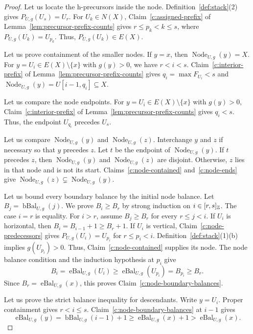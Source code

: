 \begin{proof}
 Let us locate the h-precursors inside the node.
Definition~\ref{def:stack}(2) gives $P_{U,g}(U_s)=U_r$.
For $U_k\in N(X)$, Claim~\ref{c:assigned-prefix} of
Lemma~\ref{lem:precursor-prefix-counts} gives $r\le p_k<k\le s$,
where $P_{U,g}(U_k)=U_{p_k}$. Thus, $P_{U,g}(U_k)\in E(X)$.

 Let us prove containment of the smaller nodes.
If $y=x$, then $\operatorname{Node}_{U,g}(y)=X$.
For $y=U_i\in E(X)\setminus\{x\}$ with $g(y)>0$, we have $r<i<s$.
Claim~\ref{c:interior-prefix} of Lemma~\ref{lem:precursor-prefix-counts}
gives $q_i=\max F_{U_i}<s$ and
$\operatorname{Node}_{U,g}(y)=U[i-1,q_i]\subseteq X$.

 Let us compare the node endpoints.
For $y=U_i\in E(X)\setminus\{x\}$ with $g(y)>0$,
Claim~\ref{c:interior-prefix} of Lemma~\ref{lem:precursor-prefix-counts} gives $q_i<s$.
Thus, the endpoint $U_{q_i}$ precedes $U_s$.

 Let us compare $\operatorname{Node}_{U,g}(y)$ and $\operatorname{Node}_{U,g}(z)$.
Interchange $y$ and $z$ if necessary so that $y$ precedes $z$.
Let $t$ be the endpoint of $\operatorname{Node}_{U,g}(y)$.
If $t$ precedes $z$, then $\operatorname{Node}_{U,g}(y)$ and $\operatorname{Node}_{U,g}(z)$ are disjoint.
Otherwise, $z$ lies in that node and is not its start.
Claims~\ref{c:node-contained} and~\ref{c:node-ends} give
$\operatorname{Node}_{U,g}(z)\subsetneq\operatorname{Node}_{U,g}(y)$.

 Let us bound every boundary balance by the initial node balance.
Let $B_j=\operatorname{bBal}_{U,g}(j)$.
We prove $B_i\ge B_r$ by strong induction on $i\in[r,s]_{\mathbb Z}$.
The case $i=r$ is equality.
For $i>r$, assume $B_j\ge B_r$ for every $r\le j<i$.
If $U_i$ is horizontal, then $B_i=B_{i-1}+1\ge B_r+1$.
If $U_i$ is vertical, Claim~\ref{c:node-predecessors} gives
$P_{U,g}(U_i)=U_{p_i}$ for $r\le p_i<i$.
Definition~\ref{def:stack}(1)(b) implies $g(U_{p_i})>0$. Thus, Claim~\ref{c:node-contained} supplies its node.
The node balance condition and the induction hypothesis at $p_i$ give
\[
 B_i=\operatorname{eBal}_{U,g}(U_i)
 \ge\operatorname{eBal}_{U,g}(U_{p_i})=B_{p_i}\ge B_r.
\]
Since $B_r=\operatorname{eBal}_{U,g}(x)$, this proves Claim~\ref{c:node-boundary-balances}.

 Let us prove the strict balance inequality for descendants.
Write $y=U_i$.
Proper containment gives $r<i\le s$.
Claim~\ref{c:node-boundary-balances} at $i-1$ gives
\[
 \operatorname{eBal}_{U,g}(y)=\operatorname{bBal}_{U,g}(i-1)+1
 \ge\operatorname{eBal}_{U,g}(x)+1>\operatorname{eBal}_{U,g}(x).
\]


\end{proof}
